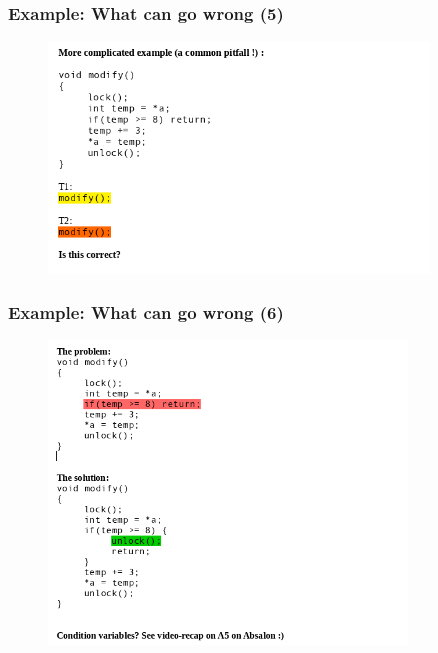 \documentclass[xcolor={usenames,dvipsnames}]{beamer}
\begin{document}
\begin{frame}
\frametitle{Example: What can go wrong (5)}
\begin{figure}
\includegraphics[width=0.9\textwidth]{images/what-can-go-wrong-5.png}
\end{figure}
\end{frame}

\begin{frame}
\frametitle{Example: What can go wrong (6)}
\begin{figure}
\includegraphics[width=0.85\textwidth]{images/what-can-go-wrong-6.png}
\end{figure}
\end{frame}
\end{document}
